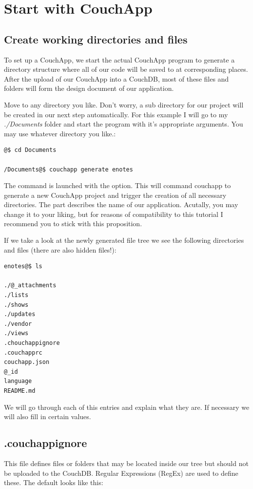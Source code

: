 \documentclass[letterpaper,10pt,english]{sphinxmanual}
\begin{document}
\section{Start with CouchApp}
\label{2-Start:start-with-couchapp}

\subsection{Create working directories and files}
\label{2-Start:create-working-directories-and-files}
To set up a CouchApp, we start the actual CouchApp program to generate a directory structure where all of our code will be saved to at corresponding places. After the upload of our CouchApp into a CouchDB, most of these files and folders will form the design document of our application.

Move to any directory you like. Don't worry, a sub directory for our project will be created in our next step automatically. For this example I will go to my \emph{./Documents} folder and start the  program with it's appropriate arguments. You may use whatever directory you like.:

\begin{Verbatim}[commandchars=@\[\]]
@$ cd Documents

/Documents@$ couchapp generate enotes
\end{Verbatim}

The  command is launched with the  option. This will command couchapp to generate a new CouchApp project and trigger the creation of all necessary directories. The  part describes the name of our application. Acutally, you may change it to your liking, but for reasons of compatibility to this tutorial I recommend you to stick with this proposition.

If we take a look at the newly generated file tree we see the following directories and files (there are also hidden files!):

\begin{Verbatim}[commandchars=@\[\]]
enotes@$ ls

./@_attachments
./lists
./shows
./updates
./vendor
./views
.chouchappignore
.couchapprc
couchapp.json
@_id
language
README.md
\end{Verbatim}

We will go through each of this entries and explain what they are. If necessary we will also fill in certain values.


\subsection{.couchappignore}
\label{2-Start:couchappignore}
This file defines files or folders that may be located inside our tree but should not be uploaded to the CouchDB. Regular Expressions (RegEx) are used to define these.
The  default looks like this:
\end{document}
